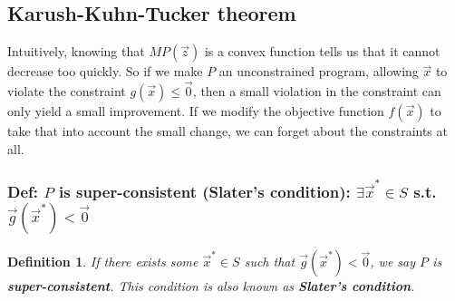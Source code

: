 \documentclass[11pt,a4paper]{article}
\newtheorem{definition}{Definition}
\begin{document}
\subsection{Karush-Kuhn-Tucker theorem}
Intuitively, knowing that $MP(\vec{z})$ is a convex function tells us that it cannot decrease too quickly. So if we make $P$ an unconstrained program, allowing $\vec{x}$ to violate the constraint $g(\vec{x}) \leq \vec{0}$, then a small violation in the constraint can only yield a small improvement. If we modify the objective function $f(\vec{x})$ to take that into account the small change, we can forget about the constraints at all.

\subsubsection{Def: $P$ is super-consistent (Slater's condition): $\exists \vec{x}^*\in S$ s.t. $\vec{g}(\vec{x}^*)<\vec{0}$}
\begin{definition}
    If there exists some $\vec{x}^*\in S$ such that $\vec{g}(\vec{x}^*)<\vec{0}$, we say $P$ is \textbf{super-consistent}. This condition is also known as \textbf{Slater's condition}.
\end{definition}
\end{document}
